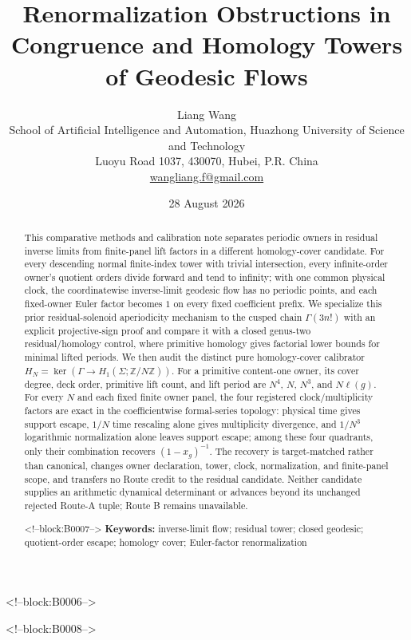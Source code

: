 \documentclass[11pt]{article}
\title{Renormalization Obstructions in Congruence and Homology Towers of Geodesic Flows}
\author{Liang Wang\\[2pt]
\small School of Artificial Intelligence and Automation, Huazhong University of Science and Technology\\
\small Luoyu Road 1037, 430070, Hubei, P.R. China\\
\small \href{mailto:wangliang.f@gmail.com}{wangliang.f@gmail.com}}
\date{28 August 2026}
\theoremstyle{definition}
\theoremstyle{remark}
\begin{document}
\maketitle

<!--block:B0006-->
\begin{abstract}
This comparative methods and calibration note separates periodic owners in residual inverse limits from finite-panel lift factors in a different homology-cover candidate. For every descending normal finite-index tower with trivial intersection, every infinite-order owner's quotient orders divide forward and tend to infinity; with one common physical clock, the coordinatewise inverse-limit geodesic flow has no periodic points, and each fixed-owner Euler factor becomes $1$ on every fixed coefficient prefix. We specialize this prior residual-solenoid aperiodicity mechanism to the cusped chain $\Gamma(3n!)$ with an explicit projective-sign proof and compare it with a closed genus-two residual/homology control, where primitive homology gives factorial lower bounds for minimal lifted periods. We then audit the distinct pure homology-cover calibrator $H_N=\ker(\Gamma\to H_1(\Sigma;\mathbb Z/N\mathbb Z))$. For a primitive content-one owner, its cover degree, deck order, primitive lift count, and lift period are $N^4$, $N$, $N^3$, and $N\ell(g)$. For every $N$ and each fixed finite owner panel, the four registered clock/multiplicity factors are exact in the coefficientwise formal-series topology: physical time gives support escape, $1/N$ time rescaling alone gives multiplicity divergence, and $1/N^3$ logarithmic normalization alone leaves support escape; among these four quadrants, only their combination recovers $(1-x_g)^{-1}$. The recovery is target-matched rather than canonical, changes owner declaration, tower, clock, normalization, and finite-panel scope, and transfers no Route credit to the residual candidate. Neither candidate supplies an arithmetic dynamical determinant or advances beyond its unchanged rejected Route-A tuple; Route B remains unavailable.

<!--block:B0007-->
\medskip
\noindent\textbf{Keywords:} inverse-limit flow; residual tower; closed geodesic; quotient-order escape; homology cover; Euler-factor renormalization
\end{abstract}

<!--block:B0008-->
\end{document}

